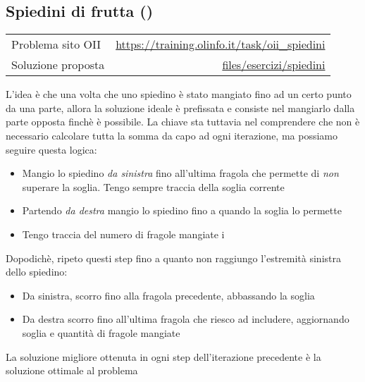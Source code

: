 \subsection{Spiedini di frutta {()}}
\label{sol spiedini}
\begin{center}
	\begin{tabularx}{\textwidth}{X r}
		\toprule
		Problema sito OII  & \url{https://training.olinfo.it/task/oii_spiedini}                      \\
		Soluzione proposta & \ttfamily\href{run:./files/esercizi/spiedini/}{files/esercizi/spiedini} \\
		\bottomrule
	\end{tabularx}
\end{center}
L'idea è che una volta che uno spiedino è stato mangiato fino ad un certo punto da una parte, allora la soluzione ideale è prefissata e consiste nel mangiarlo dalla parte opposta finchè è possibile. La chiave sta tuttavia nel comprendere che non è necessario calcolare tutta la somma da capo ad ogni iterazione, ma possiamo seguire questa logica:
\begin{itemize}
	\item Mangio lo spiedino \textit{da sinistra} fino all'ultima fragola che permette di \textit{non} superare la soglia. Tengo sempre traccia della soglia corrente
	\item Partendo \textit{da destra} mangio lo spiedino fino a quando la soglia lo permette
	\item Tengo traccia del numero di fragole mangiate
	      i
\end{itemize}
Dopodichè, ripeto questi step fino a quanto non raggiungo l'estremità sinistra dello spiedino:
\begin{itemize}
	\item Da sinistra, scorro fino alla fragola precedente, abbassando la soglia
	\item Da destra scorro fino all'ultima fragola che riesco ad includere, aggiornando soglia e quantità di fragole mangiate
\end{itemize}
La soluzione migliore ottenuta in ogni step dell'iterazione precedente è la soluzione ottimale al problema

